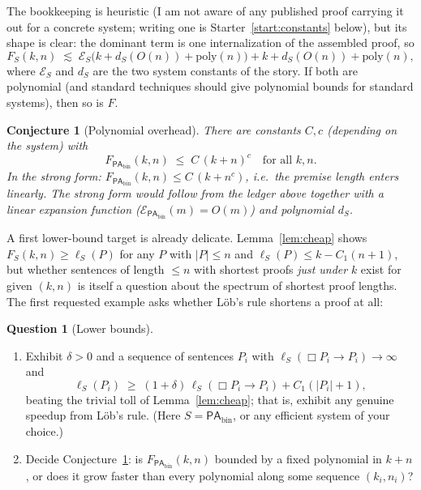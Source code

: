 \documentclass[11pt]{amsart}
\theoremstyle{plain}
\newtheorem{conjecture}[theorem]{Conjecture}
\theoremstyle{definition}
\newtheorem{question}[theorem]{Question}
\newcommand{\PAbin}{\mathsf{PA}_{\mathrm{bin}}}
\begin{document}
The bookkeeping is heuristic (I am not aware of any published proof carrying it out for a concrete system; writing one is Starter~\ref{start:constants} below), but its shape is clear: the dominant term is one internalization of the assembled proof, so
\[
F_S(k,n) \;\lesssim\; \mathcal{E}_S\bigl(k + d_S(O(n)) + \mathrm{poly}(n)\bigr) + k + d_S(O(n)) + \mathrm{poly}(n),
\]
where $\mathcal{E}_S$ and $d_S$ are the two system constants of the story. If both are polynomial (and standard techniques \cite{pudlak1998} should give polynomial bounds for standard systems), then so is $F$.

\begin{conjecture}[Polynomial overhead]
\label{conj:poly}
There are constants $C, c$ (depending on the system) with
\[
F_{\PAbin}(k,n) \;\le\; C\,(k+n)^{c} \quad \text{for all } k, n.
\]
In the strong form: $F_{\PAbin}(k,n) \le C\,(k + n^{c})$, i.e.\ the premise length enters linearly. The strong form would follow from the ledger above together with a linear expansion function ($\mathcal{E}_{\PAbin}(m) = O(m)$) and polynomial $d_S$.
\end{conjecture}

A first lower-bound target is already delicate. Lemma~\ref{lem:cheap} shows $F_S(k,n) \ge \ell_S(P)$ for any $P$ with $|P| \le n$ and $\ell_S(P) \le k - C_1(n+1)$, but whether sentences of length $\le n$ with shortest proofs \emph{just under} $k$ exist for given $(k,n)$ is itself a question about the spectrum of shortest proof lengths. The first requested example asks whether L\"ob's rule shortens a proof at all:

\begin{question}[Lower bounds]
\label{q:lower}
\hspace{1em}
\begin{enumerate}
\item Exhibit $\delta > 0$ and a sequence of sentences $P_i$ with $\ell_S(\Box P_i \to P_i) \to \infty$ and
\[
\ell_S(P_i) \;\ge\; (1+\delta)\,\ell_S(\Box P_i \to P_i) + C_1(|P_i|+1),
\]
beating the trivial toll of Lemma~\ref{lem:cheap}; that is, exhibit any genuine speedup from L\"ob's rule. (Here $S = \PAbin$, or any efficient system of your choice.)
\item Decide Conjecture~\ref{conj:poly}: is $F_{\PAbin}(k,n)$ bounded by a fixed polynomial in $k+n$, or does it grow faster than every polynomial along some sequence $(k_i, n_i)$?
\end{enumerate}
\end{question}
\end{document}
